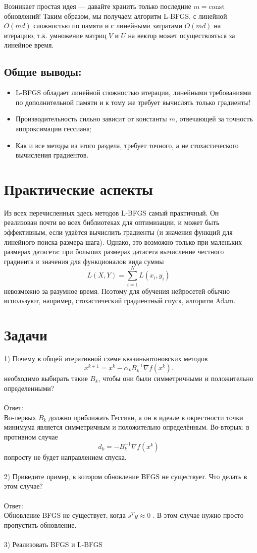 Возникает простая идея — давайте хранить только последние \(m = \text{const}\) обновлений! Таким образом,
мы получаем алгоритм L-BFGS, с линейной \(O(md)\) сложностью по памяти и с линейными затратами \(O(md)\) на итерацию, т.к. умножение матриц \(V\) и \(U\) на вектор может осуществляться за линейное время.

\subsection*{Общие выводы:}
\begin{itemize}
    \item L-BFGS обладает линейной сложностью итерации, линейными требованиями по дополнительной памяти и к тому же требует вычислять только градиенты!
    \item Производительность сильно зависит от константы $m$, отвечающей за точность аппроксимации гессиана;
    \item Как и все методы из этого раздела, требует точного, а не стохастического вычисления градиентов.
\end{itemize}

\section*{Практические аспекты}

Из всех перечисленных здесь методов L-BFGS самый практичный. Он реализован почти во всех библиотеках для оптимизации, и может быть эффективным, если удаётся вычислить градиенты (и значения функций для линейного поиска размера шага). Однако, это возможно только при маленьких размерах датасета: при больших размерах датасета вычисление честного градиента и значения для функционалов вида суммы
\[
    L(X, Y) = \sum_{i=1}^{N} L(x_i, y_i)
\]
невозможно за разумное время. Поэтому для обучения нейросетей обычно используют, например, стохастический градиентный спуск, алгоритм Adam.

\section*{Задачи}
1) Почему в общей итеративной схеме квазиньютоновских методов
\[
    x^{k+1} = x^k - \alpha_k B_k^{-1} \nabla f(x^k).
\]
необходимо выбирать такие $B_k$, чтобы они были симметричными и положительно определенными? \\
\\
Ответ: \\
Во-первых \( B_k \) должно приближать Гессиан, а он в идеале в окрестности точки минимума является симметричным и положительно определённым. Во-вторых: в противном случае
\[
    d_k = -B_k^{-1} \nabla f(x^k)
\]
попросту не будет направлением спуска. \\
\\
2) Приведите пример, в котором обновление BFGS не существует. Что делать в этом случае? \\
\\
Ответ: \\
Обновление BFGS не существует, когда $s^T y \approx 0$ . В этом случае нужно просто пропустить обновление.\\
\\
3) Реализовать BFGS и L-BFGS


